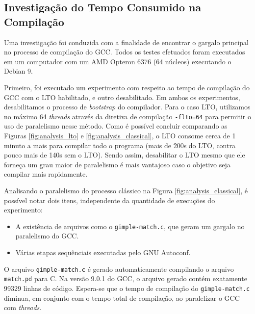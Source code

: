 \subsection{Investigação do Tempo Consumido na Compilação}

Uma investigação foi conduzida com a finalidade de encontrar o gargalo
principal no processo de compilação do GCC. Todos os testes efetuados foram
executados em um computador com um AMD Opteron 6376 (64 núcleos) executando
o Debian 9.

Primeiro, foi executado um experimento com respeito ao tempo de compilação
do GCC com o LTO habilitado, e outro desabilitado. Em ambos os experimentos,
desabilitamos o processo de \textit{bootstrap} do compilador. Para o caso LTO,
utilizamos no máximo 64 \textit{threads} através da diretiva de compilação
\texttt{-flto=64} para permitir o uso de paralelismo nesse método. Como
é possível concluir comparando as Figuras \ref{fig:analysis_lto} e \ref{fig:analysis_classical},
o LTO consome cerca de 1 minuto a mais para compilar todo o programa
(mais de 200s do LTO, contra pouco mais de 140s sem o LTO). Sendo assim,
desabilitar o LTO mesmo que ele forneça um grau maior de paralelismo é
mais vantajoso caso o objetivo seja compilar mais rapidamente.

Analisando o paralelismo do processo clássico na Figura \ref{fig:analysis_classical},
é possível notar dois itens, independente da quantidade de
execuções do experimento:

\begin{itemize}
    \item A existência de arquivos como o \texttt{gimple-match.c}, que
        geram um gargalo no paralelismo do GCC.

    \item Várias etapas sequênciais executadas pelo GNU Autoconf.
\end{itemize}

O arquivo \texttt{gimple-match.c} é gerado automaticamente compilando
o arquivo \texttt{match.pd} para C. Na versão 9.0.1 do GCC, o arquivo
gerado contém exatamente 99329 linhas de código. Espera-se que o tempo
de compilação do \texttt{gimple-match.c} diminua, em conjunto com o tempo
total de compilação, ao paralelizar o GCC com \textit{threads}.

